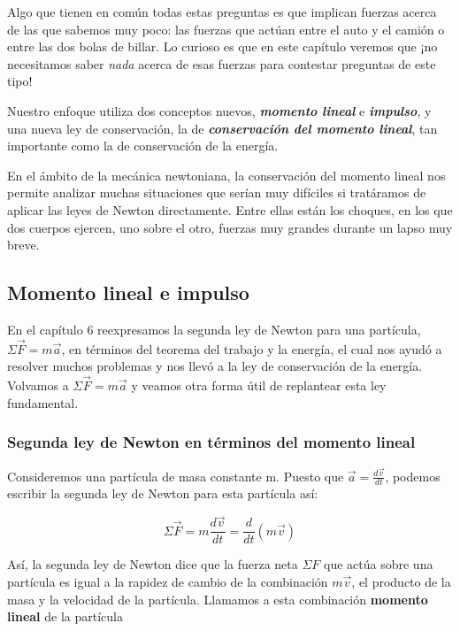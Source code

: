 \documentclass{article}
\newcommand{\newsubsection}[1]{
    \vspace{0.5cm}
    \color{sectionColor}
    \subsection{\bl{#1}}
    \color{black}
    \vspace{0.5cm}
}
\newcommand{\newtitle}[1]{
    \color{titleColor}
    \subsubsection{#1}
    \color{black}
}
\newcommand{\bl}[1]{\textbf{#1}}
\begin{document}
    \par Algo que tienen en común todas estas preguntas es que implican fuerzas acerca de las que sabemos muy poco: las fuerzas que actúan entre el auto y el camión o entre las dos bolas de billar. Lo curioso es que en este capítulo veremos que ¡no necesitamos saber \textit{nada} acerca de esas fuerzas para contestar preguntas de este tipo!

    \vspace{0.3cm}

    \par Nuestro enfoque utiliza dos conceptos nuevos, \textit{\bl{momento lineal}} e \textit{\bl{impulso}}, y una nueva ley de conservación, la de \textit{\bl{conservación del momento lineal}}, tan importante como la de conservación de la energía. 
    
    \par En el ámbito de la mecánica newtoniana, la conservación del momento lineal nos permite analizar muchas situaciones que serían muy difíciles si tratáramos de aplicar las leyes de Newton directamente. Entre ellas están los choques, en los que dos cuerpos ejercen, uno sobre el otro, fuerzas muy grandes durante un lapso muy breve.

    \newsubsection{Momento lineal e impulso}

    \par En el capítulo 6 reexpresamos la segunda ley de Newton para una partícula, $\Sigma \vec{F} = m \vec{a}$, en términos del teorema del trabajo y la energía, el cual nos ayudó a resolver muchos problemas y nos llevó a la ley de conservación de la energía. Volvamos a $\Sigma \vec{F} = m \vec{a}$ y veamos otra forma útil de replantear esta ley fundamental.

    \newtitle{Segunda ley de Newton en términos del momento lineal}

    \par Consideremos una partícula de masa constante m. Puesto que $\vec{a} = \frac{d \vec{v}}{dt}$, podemos escribir la segunda ley de Newton para esta partícula así:

    \[ \Sigma \vec{F} = m \frac{d \vec{v}}{dt} = \frac{d}{dt} \left( m \vec{v} \right) \]

    \par Así, la segunda ley de Newton dice que la fuerza neta $\Sigma F$ que actúa sobre una partícula es igual a la rapidez de cambio de la combinación $m \vec{v}$, el producto de la masa y la velocidad de la partícula. Llamamos a esta combinación \bl{momento lineal} de la partícula
\end{document}
